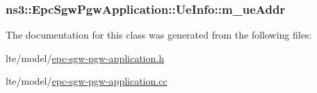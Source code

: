 \subsubsection[{\texorpdfstring{m\+\_\+ue\+Addr}{m_ueAddr}}]{ ns3\+::\+Epc\+Sgw\+Pgw\+Application\+::\+Ue\+Info\+::m\+\_\+ue\+Addr\hspace{0.3cm}{\ttfamily [private]}}\hypertarget{classns3_1_1EpcSgwPgwApplication_1_1UeInfo_a1da77d8ee7ae135b9b32cafe8d1cd277}{}\label{classns3_1_1EpcSgwPgwApplication_1_1UeInfo_a1da77d8ee7ae135b9b32cafe8d1cd277}


The documentation for this class was generated from the following files\+:\begin{DoxyCompactItemize}
\item 
lte/model/\hyperlink{epc-sgw-pgw-application_8h}{epc-\/sgw-\/pgw-\/application.\+h}\item 
lte/model/\hyperlink{epc-sgw-pgw-application_8cc}{epc-\/sgw-\/pgw-\/application.\+cc}\end{DoxyCompactItemize}
